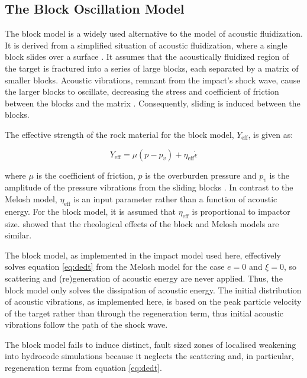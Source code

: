 \subsection{The Block Oscillation Model}

The block model is a widely used alternative to the \citet{melosh1979acoustic} model of acoustic fluidization. It is derived from a simplified situation of acoustic fluidization, where a single block slides over a surface \citep{ivanov1997block}. It assumes that the acoustically fluidized region of the target is fractured into a series of large blocks, each separated by a matrix of smaller blocks. Acoustic vibrations, remnant from the impact's shock wave, cause the larger blocks to oscillate, decreasing the stress and coefficient of friction between the blocks and the matrix \citep{collins2002numerical,ivanov1997block}. Consequently, sliding is induced between the blocks.

The effective strength of the rock material for the block model, $Y_{\text{eff}}$, is given as:

\begin{equation}
Y_{\text{eff}}=\mu (p-p_{v}) + \eta_{\text{eff}} \dot{\epsilon}
\end{equation}

where $\mu$ is the coefficient of friction, $p$ is the overburden pressure and $p_{v}$ is the amplitude of the pressure vibrations from the sliding blocks \citep{ivanov1997block,melosh1999impact}. In contrast to the Melosh model, $\eta_{\text{eff}}$ is an input parameter rather than a function of acoustic energy. For the block model, it is assumed that $\eta_{\text{eff}}$ is proportional to impactor size. \citet{melosh1999impact} showed that the rheological effects of the block and Melosh models are similar. 

The block model, as implemented in the impact model used here, effectively solves equation \ref{eq:dedt} from the Melosh model for the case $e=0$ and $\xi=0$, so scattering and (re)generation of acoustic energy are never applied. Thus, the block model only solves the dissipation of acoustic energy. The initial distribution of acoustic vibrations, as implemented here, is based on the peak particle velocity of the target rather than through the regeneration term, thus initial acoustic vibrations follow the path of the shock wave. 

The block model fails to induce distinct, fault sized zones of localised weakening into hydrocode simulations \citep{kenkmann2012modification} because it neglects the scattering and, in particular, regeneration terms from equation \ref{eq:dedt}.

